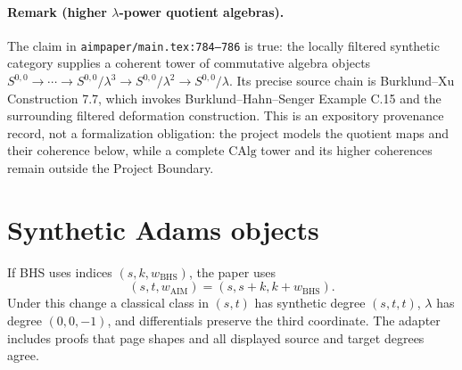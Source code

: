 \paragraph{Remark (higher $\lambda$-power quotient algebras).}
The claim in \texttt{aimpaper/main.tex:784--786} is true: the locally filtered
synthetic category supplies a coherent tower of commutative algebra objects
$S^{0,0}\to\cdots\to S^{0,0}/\lambda^3\to S^{0,0}/\lambda^2\to
S^{0,0}/\lambda$.  Its precise source chain is Burklund--Xu Construction 7.7,
which invokes Burklund--Hahn--Senger Example C.15 and the surrounding filtered
deformation construction.  This is an expository provenance record, not a
formalization obligation: the project models the quotient maps and their
coherence below, while a complete $\mathrm{CAlg}$ tower and its higher
coherences remain outside the Project Boundary.

\section{Synthetic Adams objects}

\begin{definition}
  \label{def:bhs-aim-regrading}
  \notready
  If BHS uses indices $(s,k,w_{\mathrm{BHS}})$, the paper uses
  \[
    (s,t,w_{\mathrm{AIM}})=(s,s+k,k+w_{\mathrm{BHS}}).
  \]
  Under this change a classical class in $(s,t)$ has synthetic degree
  $(s,t,t)$, $\lambda$ has degree $(0,0,-1)$, and differentials preserve the
  third coordinate.  The adapter includes proofs that page shapes and all
  displayed source and target degrees agree.
\end{definition}

